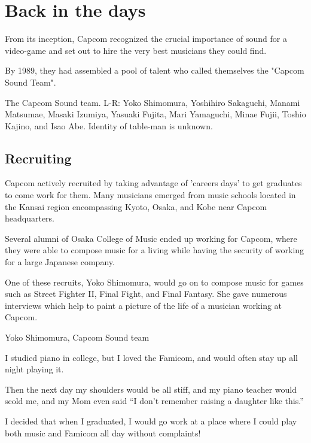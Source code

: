 \section{Back in the days}
From its inception, Capcom recognized the crucial importance of sound for a video-game and set out to hire the very best musicians they could find.

By 1989, they had assembled a pool of talent who called themselves the "Capcom Sound Team".


The Capcom Sound team. L-R: Yoko Shimomura, Yoshihiro Sakaguchi, Manami Matsumae, Masaki Izumiya, Yasuaki Fujita, Mari Yamaguchi, Minae Fujii, Toshio Kajino, and Isao Abe. Identity of table-man is unknown.

\subsection{Recruiting}
Capcom actively recruited by taking advantage of 'careers days' to get graduates to come work for them. Many musicians emerged from music schools located in the Kansai region encompassing Kyoto, Osaka, and Kobe near Capcom headquarters. 

Several alumni of Osaka College of Music ended up working for Capcom, where they were able to compose music for a living while having the security of working for a large Japanese company. 





One of these recruits, Yoko Shimomura, would go on to compose music for games such as Street Fighter II, Final Fight, and Final Fantasy. She gave numerous interviews which help to paint a picture of the life of a musician working at Capcom.


\begin{q}{Yoko Shimomura, Capcom Sound team\cite{beep199010}}

I studied piano in college, but I loved the Famicom, and would often stay up all night playing it. 

Then the next day my shoulders would be all stiff, and my piano teacher would scold me, and my Mom even said “I don’t remember raising a daughter like this.”

I decided that when I graduated, I would go work at a place where I could play both music and Famicom all day without complaints!
\end{q}


